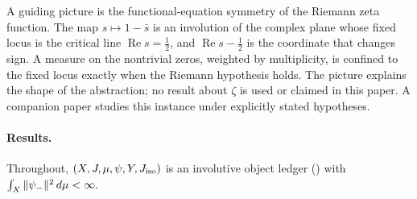 A guiding picture is the functional-equation symmetry of the Riemann
zeta function.  The map \(s\mapsto1-\bar s\) is an involution of the
complex plane whose fixed locus is the critical line
\(\operatorname{Re}s=\tfrac12\), and \(\operatorname{Re}s-\tfrac12\)
is the coordinate that changes sign.  A measure on the nontrivial
zeros, weighted by multiplicity, is confined to the fixed locus
exactly when the Riemann hypothesis holds.  The picture explains the
shape of the abstraction; no result about \(\zeta\) is used or
claimed in this paper.  A companion paper \citep{TsiokosRHviaSDTC2026}
studies this instance under explicitly stated hypotheses.

\paragraph{Results.}
Throughout, \((X,J,\mu,\psi,Y,J_{\mathrm{iso}})\) is an involutive object ledger
() with
\(\int_X\|\psi_{-}\|^2\,d\mu<\infty\).
